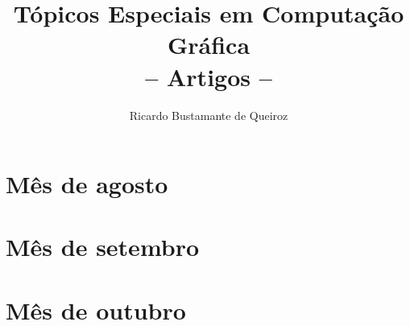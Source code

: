 \documentclass[a4paper,10pt]{report}
\author{Ricardo Bustamante de Queiroz}
\title{Tópicos Especiais em Computação Gráfica\\-- Artigos --}
\begin{document}
\maketitle
\tableofcontents

\chapter{Mês de agosto}
%


\chapter{Mês de setembro}
%





\chapter{Mês de outubro}





 


\end{document}

